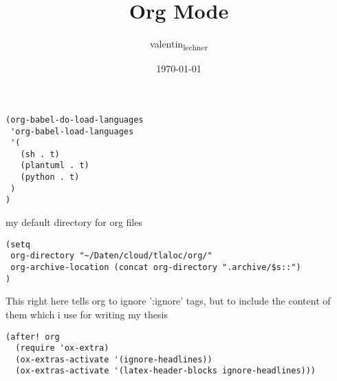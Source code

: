 \documentclass[11pt]{article}
\author{valentin\textsubscript{lechner}}
\date{\today}
\title{Org Mode}
\begin{document}
\maketitle
\tableofcontents

\begin{verbatim}
(org-babel-do-load-languages
 'org-babel-load-languages
 '(
   (sh . t)
   (plantuml . t)
   (python . t)
 )
)
\end{verbatim}
my default directory for org files
\begin{verbatim}
(setq
 org-directory "~/Daten/cloud/tlaloc/org/"
 org-archive-location (concat org-directory ".archive/$s::")
)
\end{verbatim}
This right here tells org to ignore ':ignore' tags, but to include the content
of them which i use for writing my thesis
\begin{verbatim}
(after! org
  (require 'ox-extra)
  (ox-extras-activate '(ignore-headlines))
  (ox-extras-activate '(latex-header-blocks ignore-headlines)))
\end{verbatim}
\end{document}
